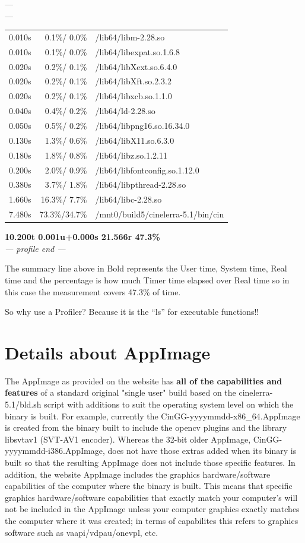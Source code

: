 ---\\
---\\
\begin{tabular}{@{}rrl}
 0.010s & 0.1\%/  0.0\% & /lib64/libm-2.28.so\\
 0.010s & 0.1\%/  0.0\% & /lib64/libexpat.so.1.6.8\\
 0.020s & 0.2\%/  0.1\% & /lib64/libXext.so.6.4.0\\
 0.020s & 0.2\%/  0.1\% & /lib64/libXft.so.2.3.2\\
 0.020s & 0.2\%/  0.1\% & /lib64/libxcb.so.1.1.0\\
 0.040s & 0.4\%/  0.2\% & /lib64/ld-2.28.so\\
 0.050s & 0.5\%/  0.2\% & /lib64/libpng16.so.16.34.0\\
 0.130s & 1.3\%/  0.6\% & /lib64/libX11.so.6.3.0\\
 0.180s & 1.8\%/  0.8\% & /lib64/libz.so.1.2.11\\
 0.200s & 2.0\%/  0.9\% & /lib64/libfontconfig.so.1.12.0\\
 0.380s & 3.7\%/  1.8\% & /lib64/libpthread-2.28.so\\
 1.660s & 16.3\%/ 7.7\% & /lib64/libc-2.28.so\\
 7.480s & 73.3\%/34.7\% & /mnt0/build5/cinelerra-5.1/bin/cin\\
\end{tabular}

\textbf{10.200t 0.001u+0.000s 21.566r  47.3\%}\\
\textit{--- profile end ---}

The summary line above in Bold represents the User time, System time, Real time and the percentage is how much Timer time elapsed over Real time so in this case the measurement covers 47.3\% of time.

So why use a Profiler? Because it is the ``ls'' for executable functions!!

\section{Details about AppImage}%
\label{sec:appimage_details}

The AppImage as provided on the \CGG{} website has \textbf{all of the 
capabilities and features} of a standard original "single user" build based on 
the cinelerra-5.1/bld.sh script with additions to suit the operating system
level on which the binary is built. For example, currently the 
CinGG-yyyymmdd-x86\_64.AppImage is created from the binary built to include the
opencv plugins and the library libsvtav1 (SVT-AV1 encoder). Whereas the 32-bit 
older AppImage, CinGG-yyyymmdd-i386.AppImage, does not have those extras added
when its binary is built so that the resulting AppImage does not include those
specific features. In addition, the website AppImage includes the graphics 
hardware/software capabilities of the computer where the binary is built. This
means that specific graphics hardware/software capabilities that exactly match your
computer's will not be included in the AppImage unless your computer graphics
exactly matches the computer where it was created; in terms of capabilites this 
refers to graphics software such as vaapi/vdpau/onevpl, etc.

